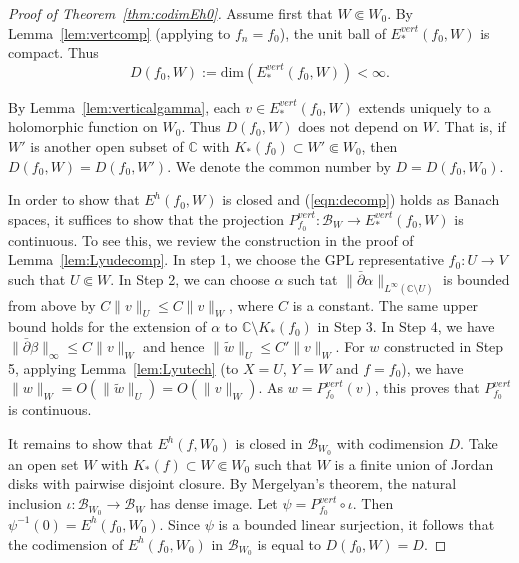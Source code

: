 \documentclass{amsart}
\numberwithin{equation}{section}
\newtheorem{corollary}[theorem]{Corollary}%
\newcommand{\C}{\mathbb C}
\theoremstyle{definition}
\theoremstyle{remark}
\begin{document}

\begin{proof}[Proof of Theorem~\ref{thm:codimEh0}] Assume first that $W\Subset W_0$. By Lemma~\ref{lem:vertcomp} (applying to $f_n=f_0$), the unit ball of $E^{vert}_*(f_0,W)$ is compact. Thus $$D(f_0, W):=\text{dim}(E^{vert}_*(f_0,W))<\infty.$$

By Lemma~\ref{lem:verticalgamma}, each $v\in E^{vert}_*(f_0,W)$ extends uniquely to a holomorphic function on $W_0$. Thus $D(f_0,W)$ does not depend on $W$. That is, if $W'$ is another open subset of $\C$ with $K_*(f_0)\subset W'\Subset W_0$, then $D(f_0,W)=D(f_0,W')$. We denote the common number by $D=D(f_0,W_0)$. 

In order to show that $E^h(f_0,W)$ is closed and (\ref{eqn:decomp}) holds as Banach spaces, it suffices to show that the projection $P^{vert}_{f_0}:\mathcal{B}_{W}\to E^{vert}_*(f_0,W)$ is continuous. To see this, we review the construction in  
the proof of Lemma~\ref{lem:Lyudecomp}. In step 1, we choose the GPL representative $f_0:U\to V$ such that $U\Subset W$. In Step 2, we can choose $\alpha$ such tat  $\|\bar{\partial}\alpha\|_{L^\infty(\C\setminus U)}$ is bounded from above by $C\|v\|_U\le C\|v\|_{W}$, where $C$ is a constant. The same upper bound holds for the extension of $\alpha$ to $\C\setminus K_*(f_0)$ in Step 3. In Step 4, we have  $\|\bar{\partial}\beta\|_\infty\le C\|v\|_{W}$ and hence $\|\widetilde{w}\|_{U}\le C'\|v\|_{W}$. 
For $w$ constructed in Step 5, applying Lemma~\ref{lem:Lyutech} (to $X=U$, $Y=W$ and $f=f_0$), we have $\|w\|_{W}=O(\|\widetilde{w}\|_{U})=O(\|v\|_{W})$. As $w=P^{vert}_{f_0}(v)$, this proves that $P^{vert}_{f_0}$ is continuous.

It remains to show that $E^h(f,W_0)$ is closed in $\mathcal{B}_{W_0}$ with codimension $D$. Take an open set $W$ with $K_*(f)\subset W\Subset W_0$ such that $W$ is a finite union of Jordan disks with pairwise disjoint closure. By Mergelyan's theorem, the natural inclusion $\iota: \mathcal{B}_{W_0}\to \mathcal{B}_{W}$ has dense image. Let $\psi=P^{vert}_{f_0}\circ \iota$. Then $\psi^{-1}(0)=E^h(f_0,W_0)$. Since $\psi$ is a bounded linear surjection, it follows that the codimension of $E^h(f_0,W_0)$ in $\mathcal{B}_{W_0}$ is equal to $D(f_0,W)=D$. 
\end{proof}
\end{document}
